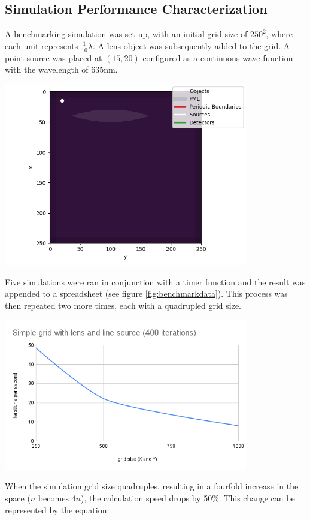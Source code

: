 \documentclass[11pt, a4paper, titlepage]{article}
\begin{document}
\subsection{Simulation Performance Characterization}
A benchmarking simulation was set up, with an initial grid size of $250^{2}$, where each unit represents $\frac{1}{10}\lambda$. A lens object was subsequently added to the grid. A point source was placed at $(15,20)$ configured as a continuous wave function with the wavelength of 635nm.
\begin{center}
	\includegraphics[width=0.8\textwidth]{gridplan.png}
\end{center}
Five simulations were ran in conjunction with a timer function and the result was appended to a spreadsheet (see figure \ref{fig:benchmarkdata}). This process was then repeated two more times, each with a quadrupled grid size.



\begin{center}
	\includegraphics[width=0.8\textwidth]{gridstats.png}
\end{center}
When the simulation grid size quadruples, resulting in a fourfold increase in the space (\( n \) becomes \( 4n \)), the calculation speed drops by 50\%. This change can be represented by the equation:
\end{document}
